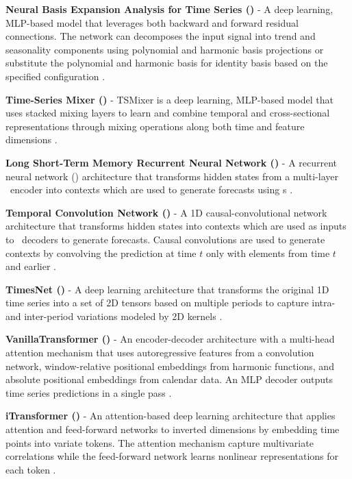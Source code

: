 \noindent\textbf{Neural Basis Expansion Analysis for Time Series (\NBEATS)} - A deep learning, MLP-based model that leverages both backward and forward residual connections. The network can decomposes the input signal into trend and seasonality components using polynomial and harmonic basis projections or substitute the polynomial and harmonic basis for identity basis based on the specified configuration \citep{oreshkin2020nbeats}.

\noindent\textbf{Time-Series Mixer (\TSMixer)} - TSMixer is a deep learning, MLP-based model that uses stacked mixing layers to learn and combine temporal and cross-sectional representations through mixing operations along both time and feature dimensions \citep{chen2023tsmixer}.

\noindent\textbf{Long Short-Term Memory Recurrent Neural Network (\LSTM)} - A recurrent neural network (\RNN) architecture that transforms hidden states from a multi-layer \LSTM\ encoder into contexts which are used to generate forecasts using \MLP s  \citep{sak2014_lstm}.

\noindent\textbf{Temporal Convolution Network (\TCN)} - A 1D causal-convolutional network architecture that transforms hidden states into contexts which are used as inputs to \MLP\ decoders to generate forecasts. Causal convolutions are used to generate contexts by convolving the prediction at time $t$ only with elements from time $t$ and earlier \citep{bai2018_tcn, oord2016_tcn}.

\noindent\textbf{TimesNet (\TimesNet)} - A deep learning architecture that transforms the original 1D time series into a set of
2D tensors based on multiple periods to capture intra- and inter-period variations modeled by 2D kernels \citep{wu2023timesnettemporal2dvariationmodeling}.

\noindent\textbf{VanillaTransformer (\VanillaTransformer)} - An encoder-decoder architecture with a multi-head attention mechanism that uses autoregressive features from a convolution network, window-relative positional embeddings from harmonic functions, and absolute positional embeddings from calendar data. An MLP decoder outputs time series predictions in a single pass \citep{vaswani_2021_attentionisallyouneed, zhou2021informerefficienttransformerlong}.

\noindent\textbf{iTransformer (\iTransformer)} - An attention-based deep learning architecture that applies attention and feed-forward networks to inverted dimensions by embedding time points into variate tokens. The attention mechanism capture multivariate correlations while the feed-forward network learns nonlinear representations for each token \citep{liu2024itransformerinvertedtransformerseffective}.

